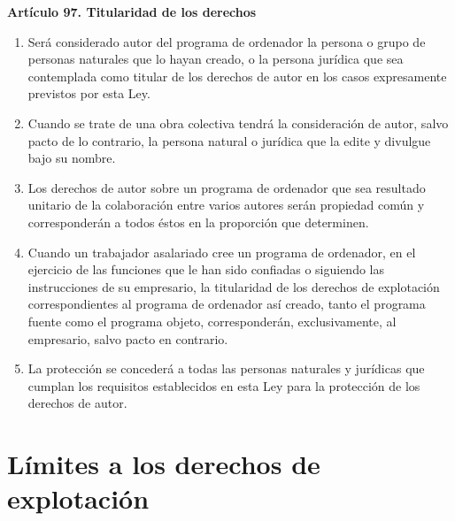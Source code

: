 \textbf{Artículo 97. Titularidad de los derechos}
\begin{enumerate}[label=\textbf{\arabic*.}]
    \item Será considerado autor del programa de ordenador la persona o grupo de personas naturales que lo hayan creado, o la persona jurídica que sea contemplada como titular de los derechos de autor en los casos expresamente previstos por esta Ley.
    \item Cuando se trate de una obra colectiva tendrá la consideración de autor, salvo pacto de lo contrario, la persona natural o jurídica que la edite y divulgue bajo su nombre.
    \item Los derechos de autor sobre un programa de ordenador que sea resultado unitario de la colaboración entre varios autores serán propiedad común y corresponderán a todos éstos en la proporción que determinen.
    \item Cuando un trabajador asalariado cree un programa de ordenador, en el ejercicio de las funciones que le han sido confiadas o siguiendo las instrucciones de su empresario, la titularidad de los derechos de explotación correspondientes al programa de ordenador así creado, tanto el programa fuente como el programa objeto, corresponderán, exclusivamente, al empresario, salvo pacto en contrario.
    \item La protección se concederá a todas las personas naturales y jurídicas que cumplan los requisitos establecidos en esta Ley para la protección de los derechos de autor.
\end{enumerate}


\section{Límites a los derechos de explotación}

